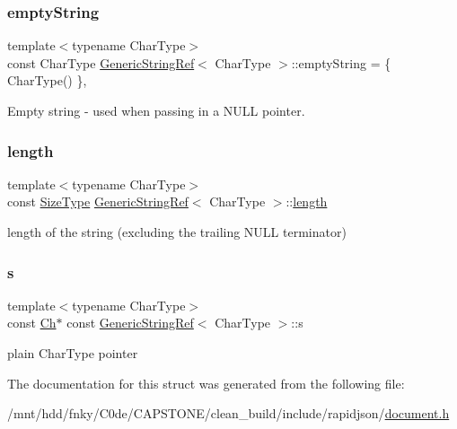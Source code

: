 \subsubsection{\texorpdfstring{empty\+String}{emptyString}}
{\footnotesize\ttfamily template$<$typename Char\+Type$>$ \\
const Char\+Type \hyperlink{structGenericStringRef}{Generic\+String\+Ref}$<$ Char\+Type $>$\+::empty\+String = \{ Char\+Type() \}\hspace{0.3cm}{\ttfamily [static]}, {\ttfamily [private]}}



Empty string -\/ used when passing in a N\+U\+LL pointer. 

\mbox{\label{structGenericStringRef_a4a96d618744ad73f766a1551b1d517fe}} 
\subsubsection{\texorpdfstring{length}{length}}
{\footnotesize\ttfamily template$<$typename Char\+Type$>$ \\
const \hyperlink{rapidjson_8h_a5ed6e6e67250fadbd041127e6386dcb5}{Size\+Type} \hyperlink{structGenericStringRef}{Generic\+String\+Ref}$<$ Char\+Type $>$\+::\hyperlink{imgui__impl__opengl3__loader_8h_a011fc24f10426c01349e94a4edd4b0d5}{length}}



length of the string (excluding the trailing N\+U\+LL terminator) 

\mbox{\label{structGenericStringRef_ac555994afd329bc9bc1780acf2f9d9be}} 
\subsubsection{\texorpdfstring{s}{s}}
{\footnotesize\ttfamily template$<$typename Char\+Type$>$ \\
const \hyperlink{structGenericStringRef_a16908c3fce41be380061330c14ba2140}{Ch}$\ast$ const \hyperlink{structGenericStringRef}{Generic\+String\+Ref}$<$ Char\+Type $>$\+::s}



plain Char\+Type pointer 



The documentation for this struct was generated from the following file\+:\begin{DoxyCompactItemize}
\item 
/mnt/hdd/fnky/\+C0de/\+C\+A\+P\+S\+T\+O\+N\+E/clean\+\_\+build/include/rapidjson/\hyperlink{document_8h}{document.\+h}\end{DoxyCompactItemize}

